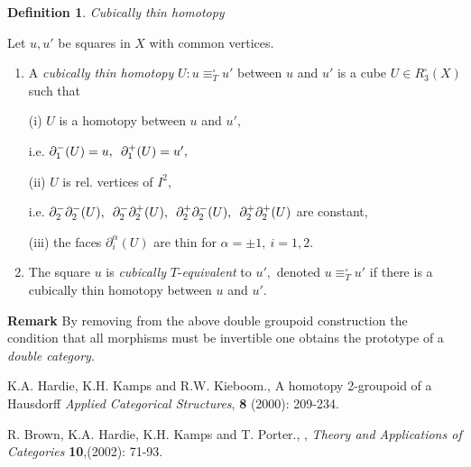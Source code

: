 \documentclass[12pt]{article}
\theoremstyle{plain}
\theoremstyle{definition}
\newtheorem{definition}{Definition}[section]
\numberwithin{equation}{section}
\newcommand{\<}{{\langle}}
\begin{document}
\begin{definition}  
\emph{Cubically thin homotopy}

 Let $u,u'$ be squares in $X$ with common vertices.
\begin{enumerate}
\item A {\it cubically thin homotopy} $U:u\equiv^{\square}_T u'$
between $u$ and $u'$ is a cube $U\in R^{\square}_3(X)$ such that

(i) $U$ is a homotopy between $u$ and $u',$

\begin{center}
i.e. $\partial^{-}_1 (U)=u,\enskip \partial^{+}_1 (U)=u',$\end{center}
(ii) $U$ is rel. vertices of $I^2,$
\begin{center}
i.e. $\partial^{-}_2\partial^{-}_2 (U),\enskip\partial^{-}_2
\partial^{+}_2 (U),\enskip
\partial^{+}_2\partial^{-}_2 (U),\enskip\partial^{+}_2
\partial^{+}_2 (U)$ are
constant,\end{center}
(iii) the faces $ \partial^{\alpha}_{i} (U) $ are thin for $ \alpha =
\pm 1, \ i = 1,2 $.


\item The square $u$ is {\it cubically} $T$-{\it equivalent} to
$u',$ denoted $u\equiv^{\square}_T u'$ if there is a cubically
thin homotopy between $u$ and $u'.$
\end{enumerate}

\end{definition}

{\bf Remark}
By removing from the above double groupoid construction the condition that all morphisms
must be invertible one obtains the prototype of a \emph{double category}.  


\begin{thebibliography}{9}

K.A. Hardie, K.H. Kamps and R.W. Kieboom., A homotopy 2-groupoid of a Hausdorff 
\emph{Applied Categorical Structures}, \textbf{8} (2000): 209-234.

R. Brown, K.A. Hardie, K.H. Kamps  and T. Porter., 
 ,
{\it Theory and Applications of Categories} \textbf{10},(2002): 71-93.

\end{thebibliography}

\end{document}
